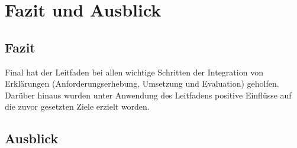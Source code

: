 \chapter{Fazit und Ausblick}

\section{Fazit}






Final hat der Leitfaden bei allen wichtige Schritten der Integration von Erklärungen (Anforderungserhebung, Umsetzung und Evaluation) geholfen. Darüber hinaus wurden unter Anwendung des Leitfadens positive Einflüsse auf die zuvor gesetzten Ziele erzielt worden. 

\section{Ausblick}

